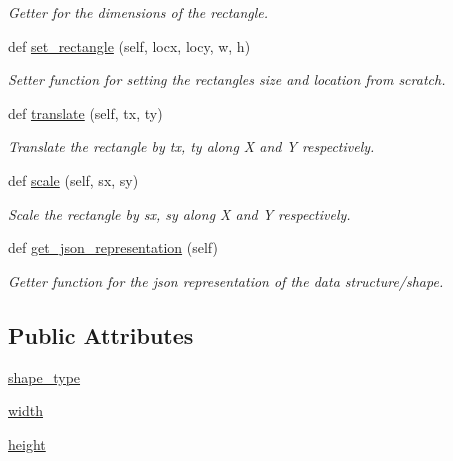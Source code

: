 \begin{DoxyCompactItemize}
\begin{DoxyCompactList}\small\item\em Getter for the dimensions of the rectangle. \end{DoxyCompactList}\item 
def \hyperlink{classbridges_1_1rectangle_1_1_rectangle_a187376dcdc5c10c5b1ce5f3f00a80961}{set\+\_\+rectangle} (self, locx, locy, w, h)
\begin{DoxyCompactList}\small\item\em Setter function for setting the rectangles size and location from scratch. \end{DoxyCompactList}\item 
def \hyperlink{classbridges_1_1rectangle_1_1_rectangle_aa032816d119516e90a4237cd979a5d41}{translate} (self, tx, ty)
\begin{DoxyCompactList}\small\item\em Translate the rectangle by tx, ty along X and Y respectively. \end{DoxyCompactList}\item 
def \hyperlink{classbridges_1_1rectangle_1_1_rectangle_af540e714f768efb6142310047fffc8c7}{scale} (self, sx, sy)
\begin{DoxyCompactList}\small\item\em Scale the rectangle by sx, sy along X and Y respectively. \end{DoxyCompactList}\item 
def \hyperlink{classbridges_1_1rectangle_1_1_rectangle_abed807aa2b797312357395f874577a64}{get\+\_\+json\+\_\+representation} (self)
\begin{DoxyCompactList}\small\item\em Getter function for the json representation of the data structure/shape. \end{DoxyCompactList}\end{DoxyCompactItemize}
\subsection*{Public Attributes}
\begin{DoxyCompactItemize}
\item 
\hyperlink{classbridges_1_1rectangle_1_1_rectangle_acd8a51dab1da86bd859fb47fb7ab1884}{shape\+\_\+type}
\item 
\hyperlink{classbridges_1_1rectangle_1_1_rectangle_ac70360e861fb0dfab5fae8525ffc86ba}{width}
\item 
\hyperlink{classbridges_1_1rectangle_1_1_rectangle_a3b7a2448881d5eea95e86aac8dfae467}{height}
\end{DoxyCompactItemize}


